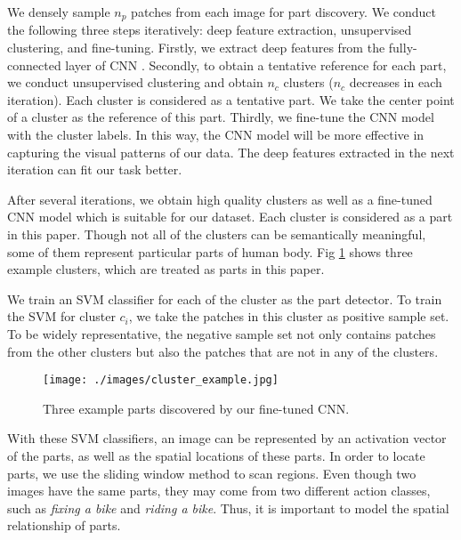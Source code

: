 \documentclass[journal]{IEEEtran}
\begin{document}
We densely sample $ n_p $ patches from each image for part discovery. We conduct the following three steps iteratively: deep feature extraction, unsupervised clustering, and fine-tuning. 
Firstly, we extract deep features from the fully-connected layer of CNN \cite{CNN__NIPS2012_4824,jia2014caffe}. Secondly, to obtain a tentative reference for each part, we conduct unsupervised clustering and obtain $ n_c $ clusters ($ n_c $ decreases in each iteration). Each cluster is considered as a tentative part. We take the center point of a cluster as the reference of this part. Thirdly, we fine-tune the CNN model with the cluster labels. In this way, the CNN model will be more effective in capturing the visual patterns of our data. The deep features extracted in the next iteration can fit our task better.





After several iterations, we obtain high quality clusters as well as a fine-tuned CNN model which is suitable for our dataset. Each cluster is considered as a part in this paper. Though not all of the clusters can be semantically meaningful, some of them represent particular parts of human body. Fig \ref{fig:clusterExample} shows three example clusters, which are treated as parts in this paper. 


We train an SVM classifier for each of the cluster as the part detector. To train the SVM for cluster $ c_i $, we take the patches in this cluster as positive sample set. To be widely representative, the negative sample set not only contains patches from the other clusters but also the patches that are not in any of the clusters. 



\begin{figure}[t]
	\begin{center}
		\texttt{[image: ./images/cluster\_example.jpg]}
	\end{center}
	\caption{Three example parts discovered by our fine-tuned CNN. }
	\label{fig:clusterExample}
\end{figure}


With these SVM classifiers, an image can be represented by an activation vector of the parts, as well as the spatial locations of these parts. In order to locate parts, we use the sliding window method to scan regions. Even though two images have the same parts, they may come from two different action classes,  such as \textit{fixing a bike} and \textit{riding a bike}. Thus, it is important to model the spatial relationship of parts.
\end{document}
